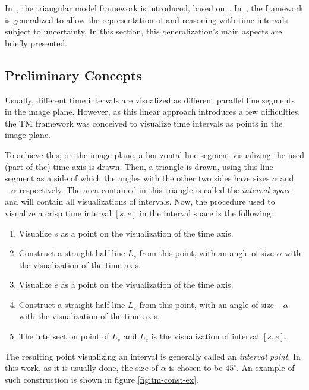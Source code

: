 In~\cite{Weghe2007}, the triangular model framework is introduced, based on~\cite{Kulpa1997}. In~\cite{DeTre2012}, the framework is generalized to allow the representation of and reasoning with time intervals subject to uncertainty. In this section, this generalization's main aspects are briefly presented. 

\subsection{\label{subsec:tm-preliminaries}Preliminary Concepts}
Usually, different time intervals are visualized as different parallel line segments in the image plane. However, as this linear approach introduces a few difficulties, the TM framework was conceived to visualize time intervals as points in the image plane.

To achieve this, on the image plane, a horizontal line segment visualizing the used (part of the) time axis is drawn. Then, a triangle is drawn, using this line segment as a side of which the angles with the other two sides have sizes $\alpha$ and $-\alpha$ respectively. The area contained in this triangle is called the \emph{interval space} and will contain all visualizations of intervals. Now, the procedure used to visualize a crisp time interval $\left[s, e\right]$ in the interval space is the following:

\begin{enumerate}
	\item Visualize $s$ as a point on the visualization of the time axis.
	\item Construct a straight half-line $L_s$ from this point, with an angle of size $\alpha$ with the visualization of the time axis.
	\item Visualize $e$ as a point on the visualization of the time axis.
	\item Construct a straight half-line $L_e$ from this point, with an angle of size $-\alpha$ with the visualization of the time axis.
	\item The intersection point of $L_s$ and $L_e$ is the visualization of interval $\left[s, e\right]$.
\end{enumerate}

The resulting point visualizing an interval is generally called an \emph{interval point}. In this work, as it is usually done, the size of $\alpha$ is chosen to be $45^{\circ}$. An example of such construction is shown in figure \ref{fig:tm-const-ex}.

